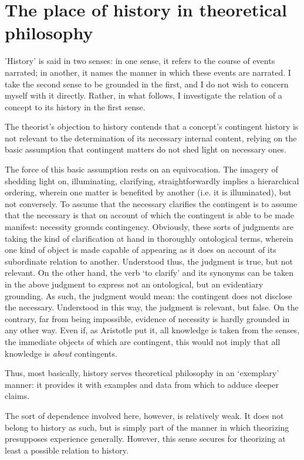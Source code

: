 \documentclass[]{article}
\begin{document}
\section{The place of history in theoretical philosophy}
'History' is said in two senses: in one sense, it refers to the course of events narrated; in another, it names the manner in which these events are narrated. I take the second sense to be grounded in the first, and I do not wish to concern myself with it directly. Rather, in what follows, I investigate the relation of a concept to its history in the first sense.

The theorist's objection to history contends that a concept's contingent history is not relevant to the determination of its necessary internal content, relying on the basic assumption that contingent matters do not shed light on necessary ones.

The force of this basic assumption rests on an equivocation. The imagery of shedding light on, illuminating, clarifying, straightforwardly implies a hierarchical ordering, wherein one matter is benefited by another (i.e. it is illuminated), but not conversely. To assume that the necessary clarifies the contingent is to assume that the necessary is that on account of which the contingent is able to be made manifest: necessity grounds contingency. Obviously, these sorts of judgments are taking the kind of clarification at hand in thoroughly ontological terms, wherein one kind of object is made capable of appearing as it does on account of its subordinate relation to another. Understood thus, the judgment is true, but not relevant. On the other hand, the verb `to clarify' and its synonyms can be taken in the above judgment to express not an ontological, but an evidentiary grounding. As such, the judgment would mean: the contingent does not disclose the necessary. Understood in this way, the judgment is relevant, but false. On the contrary, far from being impossible, evidence of necessity is hardly grounded in any other way. Even if, as Aristotle put it, all knowledge is taken from the senses, the immediate objects of which are contingent, this would not imply that all knowledge is \textit{about} contingents. 

Thus, most basically, history serves theoretical philosophy in an `exemplary' manner: it provides it with examples and data from which to adduce deeper claims. 

The sort of dependence involved here, however, is relatively weak. It does not belong to history as such, but is simply part of the manner in which theorizing presupposes experience generally. However, this sense secures for theorizing at least a possible relation to history.
\end{document}
